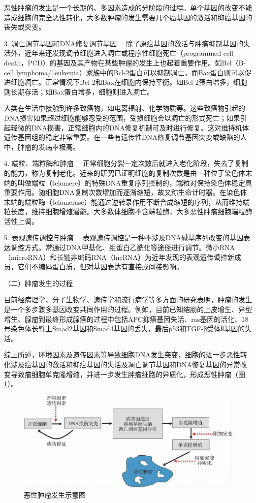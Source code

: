 恶性肿瘤的发生是一个长期的、多因素造成的分阶段的过程。单个基因的改变不能造成细胞的完全恶性转化，大多数肿瘤的发生需要几个癌基因的激活和抑癌基因的丧失或突变。

{3. 凋亡调节基因和DNA修复调节基因}
　除了原癌基因的激活与肿瘤抑制基因的失活外，近年来还发现调节细胞进入凋亡或程序性细胞死亡（programmed
cell
death，PCD）的基因及其产物在某些肿瘤的发生上也起着重要作用。如Bcl（B-cell
lymphoma/1eukemia）家族中的Bcl-2蛋白可以抑制凋亡，而Bax蛋白则可以促进细胞凋亡。正常情况下Bcl-2和Bax在细胞内保持平衡。如Bcl-2蛋白增多，细胞则长期存活；如Bax蛋白增多，细胞则进入凋亡。

人类在生活中接触到许多致癌物，如电离辐射、化学物质等。这些致癌物引起的DNA损害如果超过细胞能够忍受的范围，受损细胞会以凋亡的形式死亡；如果引起轻微的DNA损害，正常细胞内的DNA修复机制可及时进行修复。这对维持机体遗传基因组的稳定非常重要。在一些有遗传性DNA修复调节基因突变或缺陷的人中，肿瘤的发病率极高。

{4. 端粒、端粒酶和肿瘤}
　正常细胞分裂一定次数后就进入老化阶段，失去了复制的能力，称为复制老化。近来的研究已证明细胞的复制次数是由一种位于染色体末端的叫做端粒（telomere）的特殊DNA重复序列控制的，端粒对保持染色体稳定具重要作用。随细胞DNA复制次数增加而逐渐缩短，故又称生命计时器。在染色体末端的端粒酶（telomerase）能通过逆转录作用不断合成缩短的序列，从而维持端粒长度，维持细胞增殖潜能。大多数体细胞不含端粒酶，大多恶性肿瘤细胞端粒酶活性上调。

{5. 表观遗传调控与肿瘤}
　表观遗传调控是一种不涉及DNA碱基序列改变的基因表达调控方式。常通过DNA甲基化、组蛋白乙酰化等途径进行调节。微小RNA（microRNA）和长链非编码RNA（lncRNA）为近年发现的表观遗传调控新成员，它们不编码蛋白质，但对基因表达有直接或间接影响。

{（二）肿瘤发生的过程}

目前经病理学、分子生物学、遗传学和流行病学等多方面的研究表明，肿瘤的发生是一个多步骤多基因改变共同作用的过程。例如，目前已知结肠的上皮增生、异型增生、腺瘤到最终形成腺癌的过程中包括APC抑癌基因失活、ras基因的活化、18号染色体长臂上Smad2基因和Smad4基因的丢失，最后p53和TGF-β受体Ⅱ基因的失活。

综上所述，环境因素及遗传因素等导致细胞DNA发生突变，细胞的进一步恶性转化涉及癌基因的激活和抑癌基因的失活及凋亡调节基因和DNA修复基因的异常改变导致瘤细胞单克隆增殖，并进一步发生肿瘤细胞的异质化，形成恶性肿瘤（图\ref{fig5-23}）。

\begin{figure}[!htbp]
 \centering
 \includegraphics[scale=1.2]{./images/Image00092.jpg}
 \caption{恶性肿瘤发生示意图}
 \label{fig5-23}
  \end{figure}

